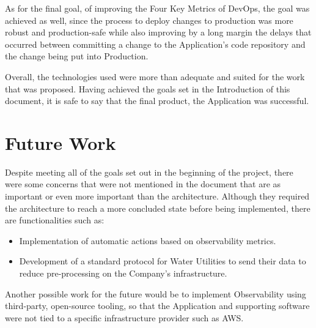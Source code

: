 As for the final goal, of improving the Four Key Metrics of DevOps, the goal was achieved as well, since the process to deploy changes to production was more robust and production-safe while also improving by a long margin the delays that occurred between committing a change to the Application's code repository and the change being put into Production. 

Overall, the technologies used were more than adequate and suited for the work that was proposed. Having achieved the goals set in the Introduction of this document, it is safe to say that the final product, the Application was successful.

\section{Future Work}\label{conclusion:s:future-work}

Despite meeting all of the goals set out in the beginning of the project, there were some concerns that were not mentioned in the document that are as important or even more important than the architecture. 
Although they required the architecture to reach a more concluded state before being implemented, there are functionalities such as:

\begin{itemize}
    \item Implementation of automatic actions based on observability metrics.
    \item Development of a standard protocol for Water Utilities to send their data to reduce pre-processing on the Company's infrastructure.
\end{itemize}

Another possible work for the future would be to implement Observability using third-party, open-source tooling, so that the Application and supporting software were not tied to a specific infrastructure provider such as AWS. 
